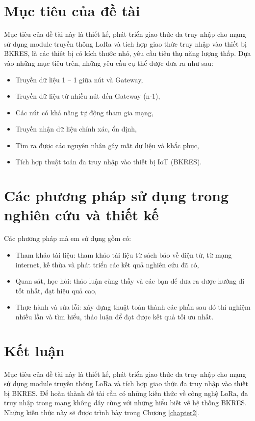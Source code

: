 \section{Mục tiêu của đề tài}
Mục tiêu của đề tài này là thiết kế, phát triển giao thức đa truy nhập cho mạng sử dụng module truyền thông LoRa và tích hợp giao thức truy nhập vào thiết bị BKRES, là các thiêt bị có kích thước nhỏ, yêu cầu tiêu thụ năng lượng thấp. Dựa vào những mục tiêu trên, những yêu cầu cụ thể được đưa ra như sau:
\begin{itemize}
\item Truyền dữ liệu 1 – 1 giữa nút và Gateway,
\item Truyền dữ liệu từ nhiều nút đến Gateway (n-1),
\item Các nút có khả năng tự động tham gia mạng,
\item Truyền nhận dữ liệu chính xác, ổn định,
\item Tìm ra được các nguyên nhân gây mất dữ liệu và khắc phục,
\item Tích hợp thuật toán đa truy nhập vào thiết bị IoT (BKRES).
\end{itemize}
\section{Các phương pháp sử dụng trong nghiên cứu và thiết kế}
Các phương pháp mà em sử dụng gồm có:
\begin{itemize}
\item   Tham khảo tài liệu: tham khảo tài liệu từ sách báo về điện tử, từ mạng internet, kế thừa và phát triển các kết quả nghiên cứu đã có,
\item   Quan sát, học hỏi: thảo luận cùng thầy và các bạn để đưa ra được hướng đi tốt nhất, đạt hiệu quả cao,
\item   Thực hành và sửa lỗi: xây dựng thuật toán thành các phần sau đó thí nghiệm nhiều lần và tìm hiểu, thảo luận để đạt được kết quả tối ưu nhất.
\end{itemize}\par
\section{Kết luận}
Mục tiêu của đề tài này là thiết kế, phát triển giao thức đa truy nhập cho mạng sử dụng module truyền thông LoRa và tích hợp giao thức đa truy nhập vào thiết bị BKRES. Để hoàn thành đề tài cần có  những kiến thức về công nghệ LoRa, đa truy nhập trong mạng không dây cùng với những hiểu biết về hệ thống BKRES. Những kiến thức này sẽ được trình bày trong Chương \ref{chapter2}.

